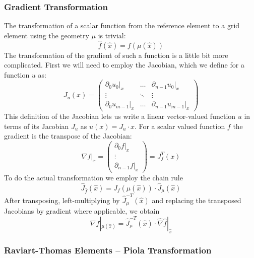 \documentclass[a4paper,11pt]{article}
\begin{document}
\subsubsection{Gradient Transformation}

The transformation of a scalar function from the reference element to a grid
element using the geometry $\mu$ is trivial:
\begin{equation}
  \hat f(\hat x) = f(\mu(\hat x))
\end{equation}
The transformation of the gradient of such a function is a little bit more
complicated.  First we will need to employ the Jacobian, which we define for a
function $u$ as:
\begin{equation}
  J_u(x)=\begin{pmatrix}
    \partial_0u_0|_x     & \ldots & \partial_{n-1}u_0|_x \\
    \vdots               & \ddots & \vdots \\
    \partial_0u_{m-1}|_x & \ldots & \partial_{n-1}u_{m-1}|_x
  \end{pmatrix}
\end{equation}
This definition of the Jacobian lets us write a linear vector-valued function
$u$ in terms of its Jacobian $J_u$ as $u(x) = J_u \cdot x$.  For a scalar
valued function $f$ the gradient is the transpose of the Jacobian:
\begin{equation}
  \nabla f|_x = \begin{pmatrix}
    \partial_0f|_x \\ \vdots \\ \partial_{n-1}f|_x
  \end{pmatrix} = J_f^T(x)
\end{equation}
To do the actual transformation we employ the chain rule
\begin{equation}
  \hat J_{\hat f}({\hat x}) = J_f(\mu(\hat x))\cdot \hat J_\mu(\hat x)
\end{equation}
After transposing, left-multiplying by $\hat J_\mu^{-T}(\hat x)$ and replacing
the transposed Jacobians by gradient where applicable, we obtain
\begin{equation}
  \nabla f|_{\mu(\hat x)}
    = \hat J_\mu^{-T}(\hat x) \cdot \hat\nabla\hat f|_{\hat x}
\end{equation}

\subsubsection{Raviart-Thomas Elements -- Piola Transformation}
\end{document}
